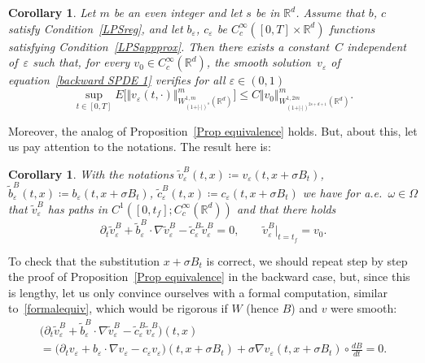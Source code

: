 \documentclass[a4paper,10pt]{article}
\newtheorem{corollary}[theorem]{Corollary}
\newcommand\1{\mathbbm{1}}
\newcommand{\eps}{\varepsilon}
\numberwithin{equation}{section}
\begin{document}
\begin{corollary}
\label{corollary regularity backward} Let $m$ be an even integer and let $s$ be in $\mathbb{R}^d$. Assume that $b$, $c$ satisfy Condition~\ref{LPSreg}, and let $b_{\eps}$, $c_{\eps}$ be $C_{c}^{\infty}([0,T]\times\mathbb{R}^d)$ functions satisfying Condition~\ref{LPSappprox}. Then there exists a constant~$C$ independent of~$\eps$ such that, for every  $v_{0}\in C_{c}^{\infty}(\mathbb{R}^d)$, the smooth solution~$v_{\eps}$ of equation~\eqref{backward SPDE 1} verifies for all $\eps\in (0,1)$
\begin{equation*}
\sup_{t\in [0,T]} E\Big[ \Vert v_{\eps}(t,\cdot)\Vert_{W_{(1+ \vert \cdot \vert)^{s}}^{1,m}(\mathbb{R}^{d})}^{m}\Big]  \leq C \Vert v_{0}\Vert _{W_{(  1+ \vert \cdot \vert )
^{2s+d+1}}^{1,2m}(\mathbb{R}^{d})}^{m}.
\end{equation*}
\end{corollary}

Moreover, the analog of Proposition~\ref{Prop equivalence} holds. But, about this, let us pay attention to the notations. The result here is:

\begin{corollary}

With the notations $\widetilde{v}_{\eps}^{B}(t,x) \coloneqq v_{\eps}(t,x+\sigma B_{t})$, $\widetilde{b}_{\eps}^{B}(t,x) \coloneqq b_{\eps}(t,x+\sigma B_{t})$, $\widetilde{c}_{\eps}^{B}(t,x) \coloneqq c_{\eps}(t,x+\sigma B_{t})$ we have for a.e.~$\omega\in\Omega$ that $\widetilde{v}_{\eps}^{B}$ has paths in $C^{1}([0,t_{f}];C_{c}^{\infty}(\mathbb{R}^{d}))$ and that there holds
\begin{equation}
\partial_t \widetilde{v}_{\eps}^{B}+\widetilde{b}_{\eps}^{B}\cdot\nabla\widetilde{v}_{\eps}^{B}-\widetilde{c}_{\eps}^{B}\widetilde{v}_{\eps}^{B}=0,\qquad\widetilde{v}_{\eps}^{B}|_{t=t_{f}}=v_{0} . \label{pre-dual equation}
\end{equation}
\end{corollary}

To check that the substitution $x+\sigma B_{t}$ is correct, we should repeat step by step the proof of Proposition~\ref{Prop equivalence} in the backward case, but, since this is lengthy, let us only convince ourselves with a formal computation, similar to~\eqref{formalequiv}, which would be rigorous if $W$ (hence $B$) and $v$ were smooth:
\begin{multline*}
\Big( \partial_t \widetilde{v}_{\eps}^{B} +\widetilde{b}_{\eps}^{B}\cdot\nabla\widetilde{v}_{\eps}^{B}-\widetilde{c}_{\eps}^{B}\widetilde{v}_{\eps}^{B}\Big) (t,x) \\
  = \Big( \partial_t v_{\eps} +b_{\eps}\cdot\nabla v_{\eps}-c_{\eps}v_{\eps}\Big) (t,x+\sigma B_{t}) +\sigma\nabla v_{\eps}(t,x+\sigma B_{t}) \circ \frac{dB}{dt}=0 .
\end{multline*}
\end{document}
